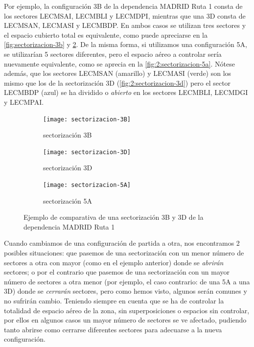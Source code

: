 Por ejemplo, la configuración 3B de la dependencia MADRID Ruta 1 consta de los sectores LECMSAI, LECMBLI y LECMDPI, mientras que una 3D consta de LECMSAN, LECMASI y LECMBDP. En ambos casos se utilizan tres sectores y el espacio cubierto total es equivalente, como puede apreciarse en la \autoref{fig:sectorizacion-3b} y \ref{fig:2:sectorizacion-3d}.
De la misma forma, si utilizamos una configuración 5A, se utilizarían 5 sectores diferentes, pero el espacio aéreo a controlar sería nuevamente equivalente, como se aprecia en la \autoref{fig:2:sectorizacion-5a}.
Nótese además, que los sectores LECMSAN (amarillo) y LECMASI (verde) son los mismo que los de la sectorización 3D (\autoref{fig:2:sectorizacion-3d}) pero el sector LECMBDP (azul) se ha dividido o \textit{abierto} en los sectores LECMBLI, LECMDGI y LECMPAI.

\begin{figure}[htbp]
    \centering
    \begin{subfigure}{\linewidth}
        \centering
        \texttt{[image: sectorizacion-3B]}
        \caption{sectorización 3B\linebreak}
        \label{fig:sectorizacion-3b}
    \end{subfigure}

    \begin{subfigure}{\linewidth}
        \centering
        \texttt{[image: sectorizacion-3D]}
        \caption{sectorización 3D\linebreak}
        \label{fig:2:sectorizacion-3d}
    \end{subfigure}

    \begin{subfigure}{\linewidth}
        \centering
        \texttt{[image: sectorizacion-5A]}
        \caption{sectorización 5A}
        \label{fig:2:sectorizacion-5a}
    \end{subfigure}

    \caption[Ejemplo de sectorización 3B y 3D de la dependencia MADRID Ruta 1]{Ejemplo de comparativa de una 
    sectorización 3B y 3D 
    de la dependencia MADRID Ruta 1}
    \label{fig:2:comparativa3B-3D}
\end{figure}


Cuando cambiamos de una configuración de partida a otra, nos encontramos 2 posibles situaciones: que pasemos de una sectorización con un menor número de sectores a otra con mayor (como en el ejemplo anterior) donde se \textit{abrirán} sectores; o por el contrario que pasemos de una sectorización con un mayor número de sectores a otra menor (por ejemplo, el caso contrario: de una 5A a una 3D) donde se \textit{cerrarán} sectores, pero como hemos visto, algunos serán comunes y no sufrirán cambio. 
Teniendo siempre en cuenta que se ha de controlar la totalidad de espacio aéreo de la zona, sin superposiciones o espacios sin controlar, por ellos en algunos casos un mayor número de sectores se ve afectado, pudiendo tanto abrirse como cerrarse diferentes sectores para adecuarse a la nueva configuración.

